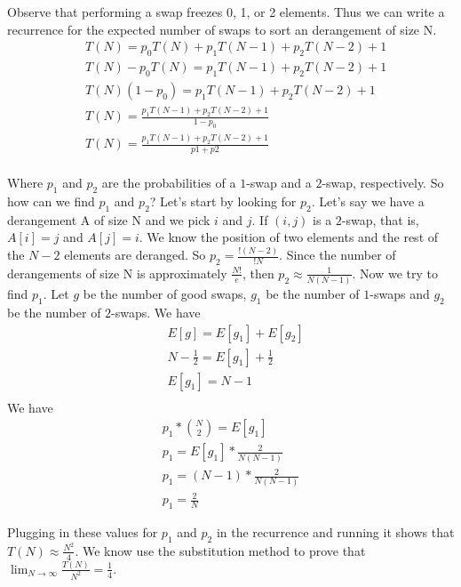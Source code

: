 \documentclass{article}
\begin{document}
Observe that performing a swap freezes 0, 1, or 2 elements. Thus we can write a recurrence
for the expected number of swaps to sort an derangement of size N.
\begin{align}
    & T(N) = p_0T(N) + p_1T(N - 1) + p_2T(N - 2) + 1 \\\nonumber
    & T(N) - p_0T(N) = p_1T(N - 1) + p_2T(N - 2) + 1 \\\nonumber
    & T(N)(1 - p_0) = p_1T(N - 1) + p_2T(N - 2) + 1 \\\nonumber
    & T(N) = \frac{p_1T(N - 1) + p_2T(N - 2) + 1}{1 - p_0} \\\nonumber
    & T(N) = \frac{p_1T(N - 1) + p_2T(N - 2) + 1}{p1 + p2} \\\nonumber
\end{align}

Where $p_1$ and $p_2$ are the probabilities of a $1$-swap and a $2$-swap, respectively.
So how can we find $p_1$ and $p_2$?
Let's start by looking for $p_2$. Let's say we have
a derangement A of size N and we pick $i$ and $j$. If $(i ,j)$ is a $2$-swap, that is,
$A[i] = j$ and $A[j] = i$. We know the position of two elements and the rest of the $N - 2$ elements
are deranged. So $p_2 = \frac{!(N - 2)}{!N}$. Since the number of derangements of size N is approximately
$\frac{N!}{e}$, then $p_2 \approx \frac{1}{N(N - 1)}$.
Now we try to find $p_1$. Let $g$ be the number of good swaps, $g_1$ be the number of $1$-swaps
and $g_2$ be the number of $2$-swaps. We have
\begin{align}
    & E[g] = E[g_1] + E[g_2] \\\nonumber
    & N - \frac{1}{2} = E[g_1] + \frac{1}{2} \\\nonumber
    & E[g_1] = N - 1  \\\nonumber
\end{align}
We have
\begin{align}
    p_1 * {N \choose 2} = E[g_1] \\\nonumber
    p_1 = E[g_1] * \frac{2}{N(N - 1)} \\\nonumber
    p_1 = (N - 1) * \frac{2}{N(N - 1)} \\\nonumber
    p_1 = \frac{2}{N}
\end{align}

Plugging in these values for $p_1$ and $p_2$ in the recurrence and running it shows
that $T(N) \approx \frac{N^2}{4}$. We know use the substitution method to prove that
$\lim_{N \to \infty} \frac{T(N)}{N^2} = \frac{1}{4}$.
\end{document}
